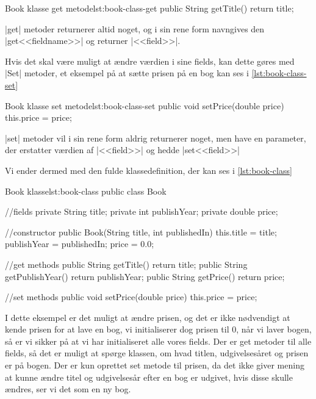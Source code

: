 \begin{JavaCode}{Book klasse get metode}{lst:book-class-get}
	public String getTitle() {
		return title;
	}
\end{JavaCode}

\JavaInline|get| metoder returnerer altid noget, og i sin rene form
navngives den \JavaInline|get<<fieldname>>| og returner
\JavaInline|<<field>>|.

Hvis det skal være muligt at ændre værdien i sine fields, kan dette
gøres med \JavaInline|Set| metoder, et eksempel på at sætte prisen på
en bog kan ses i \autoref{lst:book-class-set}

\begin{JavaCode}{Book klasse set metode}{lst:book-class-set}
	public void setPrice(double price) {
		this.price = price;
	}
\end{JavaCode}

\JavaInline|set| metoder vil i sin rene form aldrig returnerer noget,
men have en parameter, der erstatter værdien af \JavaInline|<<field>>|
og hedde \JavaInline|set<<field>>|

Vi ender dermed med den fulde klassedefinition, der kan ses i
\autoref{lst:book-class}

\begin{JavaCode}{Book klasse}{lst:book-class}
	public class Book {
		//fields
		private String title;
		private int publishYear;
		private double price;

		//constructor
		public Book(String title, int publishedIn) {
			this.title = title;
			publishYear = publishedIn;
			price = 0.0;
		}

		//get methods
		public String getTitle() {
			return title;
		}
		public String getPublishYear() {
			return publishYear;
		}
		public String getPrice() {
			return price;
		}

		//set methods
		public void setPrice(double price) {
			this.price = price;
		}
	}
\end{JavaCode}

I dette eksempel er det muligt at ændre prisen, og det er ikke
nødvendigt at kende prisen for at lave en bog, vi initialiserer dog
prisen til 0, når vi laver bogen, så er vi sikker på at vi har
initialiseret alle vores fields. Der er get metoder til alle fields,
så det er muligt at spørge klassen, om hvad titlen, udgivelsesåret og
prisen er på bogen. Der er kun oprettet set metode til prisen, da det
ikke giver mening at kunne ændre titel og udgivelsesår efter en bog er
udgivet, hvis disse skulle ændres, ser vi det som en ny bog.

